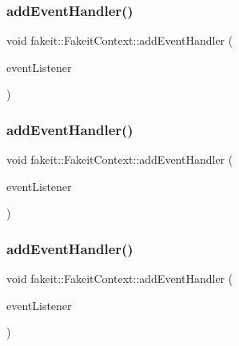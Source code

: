 \subsubsection{\texorpdfstring{addEventHandler()}{addEventHandler()}\hspace{0.1cm}{\footnotesize\ttfamily [1/9]}}
{\footnotesize\ttfamily void fakeit\+::\+Fakeit\+Context\+::add\+Event\+Handler (\begin{DoxyParamCaption}\item[{\mbox{\hyperlink{structfakeit_1_1EventHandler}{Event\+Handler}} \&}]{event\+Listener }\end{DoxyParamCaption})\hspace{0.3cm}{\ttfamily [inline]}}

\mbox{\label{structfakeit_1_1FakeitContext_a176ad0df1fcb2758648f2c9b6c8fdd0d}} 
\subsubsection{\texorpdfstring{addEventHandler()}{addEventHandler()}\hspace{0.1cm}{\footnotesize\ttfamily [2/9]}}
{\footnotesize\ttfamily void fakeit\+::\+Fakeit\+Context\+::add\+Event\+Handler (\begin{DoxyParamCaption}\item[{\mbox{\hyperlink{structfakeit_1_1EventHandler}{Event\+Handler}} \&}]{event\+Listener }\end{DoxyParamCaption})\hspace{0.3cm}{\ttfamily [inline]}}

\mbox{\label{structfakeit_1_1FakeitContext_a176ad0df1fcb2758648f2c9b6c8fdd0d}} 
\subsubsection{\texorpdfstring{addEventHandler()}{addEventHandler()}\hspace{0.1cm}{\footnotesize\ttfamily [3/9]}}
{\footnotesize\ttfamily void fakeit\+::\+Fakeit\+Context\+::add\+Event\+Handler (\begin{DoxyParamCaption}\item[{\mbox{\hyperlink{structfakeit_1_1EventHandler}{Event\+Handler}} \&}]{event\+Listener }\end{DoxyParamCaption})\hspace{0.3cm}{\ttfamily [inline]}}

